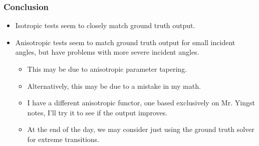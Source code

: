 \documentclass{beamer}
\begin{document}
\begin{frame}
\frametitle{Conclusion}

\begin{itemize}

\pause \item Isotropic tests seem to closely match ground truth output.
\pause \item Anisotropic tests seem to match ground truth output for small incident angles, but have problems with more severe incident angles.

\begin{itemize}
\pause \item This may be due to anisotropic parameter tapering.
\pause \item Alternatively, this may be due to a mistake in my math.
\pause \item I have a different anisotropic functor, one based exclusively on Mr. Yingst notes, I'll try it to see if the output improves.
\pause \item At the end of the day, we may consider just using the ground truth solver for extreme transitions.
\end{itemize}

\end{itemize}

\end{frame}
\end{document}
